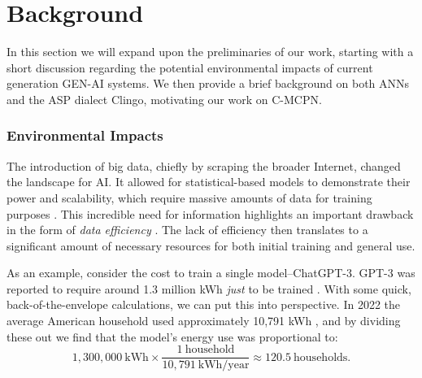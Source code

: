 \section{Background}
In this section we will expand upon the preliminaries of our work, starting with a short discussion regarding the potential environmental impacts of current generation GEN-AI systems. We then provide a brief background on both ANNs and the ASP dialect Clingo, motivating our work on C-MCPN.

\subsubsection{Environmental Impacts}\label{env_impacts}

The introduction of big data, chiefly by scraping the broader Internet, changed the landscape for AI. It allowed for statistical-based models to demonstrate their power and scalability, which require massive amounts of data for training purposes \parencite{Goodfellow2016}. This incredible need for information highlights an important drawback in the form of \emph{data efficiency} \parencite{Cropper2020}. The lack of efficiency then translates to a significant amount of necessary resources for both initial training and general use.

As an example, consider the cost to train a single model--ChatGPT-3. GPT-3 was reported to require around 1.3 million kWh \emph{just} to be trained \textcite{DeVries2023}. With some quick, back-of-the-envelope calculations, we can put this into perspective. In 2022 the average American household used approximately 10,791 kWh \parencite{EIA2024}, and by dividing these out we find that the model's energy use was proportional to:
\[1{,}300{,}000~\text{kWh} \times \frac{1~\text{household}}{10{,}791~\text{kWh/year}} \approx 120.5~\text{households}.\]



